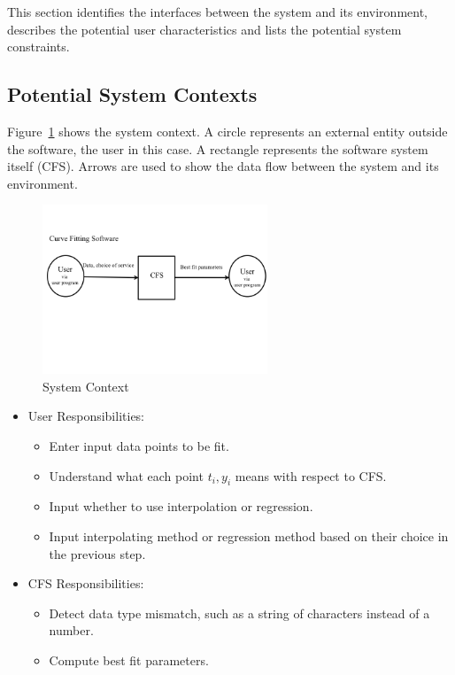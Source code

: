 \documentclass[12pt]{article}
\newcommand{\famname}{CFS} %
\begin{document}
This section identifies the interfaces between the system and its environment,
describes the potential user characteristics and lists the potential system
constraints.

\subsection{Potential System Contexts}

Figure~\ref{Fig_SystemContext} shows the system context.  A circle represents an
external entity outside the software, the user in this case.  A rectangle
represents the software system itself (\famname{}).  Arrows are used to show
the data
flow between the system and its environment.

\begin{figure}[h!]
	\begin{center}
		\includegraphics[width=0.6\textwidth]{SystemContextFigure.png}
		\caption{System Context}
		\label{Fig_SystemContext} 
	\end{center}
\end{figure}


\begin{itemize}
\item User Responsibilities:
\begin{itemize}
\item Enter input data points to be fit.
\item Understand what each point $t_i, y_i$ means with respect to \famname{}.
\item Input whether to use interpolation or regression.
\item Input interpolating method or regression method based on their choice in the previous step. 
\end{itemize}
\item \famname{} Responsibilities:
\begin{itemize}
\item Detect data type mismatch, such as a string of characters instead of a number.
\item Compute best fit parameters.
\end{itemize}
\end{itemize}
\end{document}
